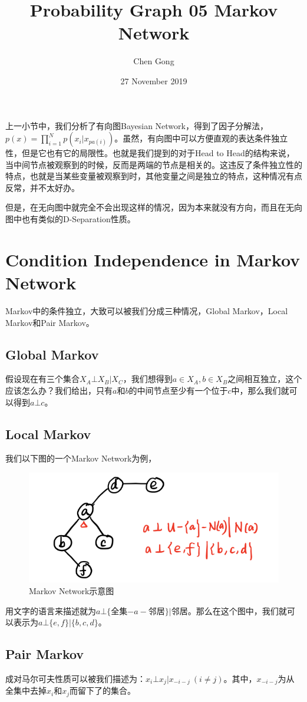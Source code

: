 \documentclass[a4paper]{article}
\title{Probability Graph 05 Markov Network}
\author{Chen Gong}
\date{27 November 2019}
\begin{document}
\maketitle
上一小节中，我们分析了有向图Bayesian Network，得到了因子分解法，$p(x) = \prod_{i=1}^N p(x_i|x_{pa(i)})$。虽然，有向图中可以方便直观的表达条件独立性，但是它也有它的局限性。也就是我们提到的对于Head to Head的结构来说，当中间节点被观察到的时候，反而是两端的节点是相关的。这违反了条件独立性的特点，也就是当某些变量被观察到时，其他变量之间是独立的特点，这种情况有点反常，并不太好办。

但是，在无向图中就完全不会出现这样的情况，因为本来就没有方向，而且在无向图中也有类似的D-Separation性质。
\section{Condition Independence in Markov Network}
Markov中的条件独立，大致可以被我们分成三种情况，Global Markov，Local Markov和Pair Markov。
\subsection{Global Markov}
假设现在有三个集合$X_A \bot X_B | X_C$，我们想得到$a\in X_A,b\in X_B$之间相互独立，这个应该怎么办？我们给出，只有$a$和$b$的中间节点至少有一个位于$c$中，那么我们就可以得到$a \bot c$。

\subsection{Local Markov}
我们以下图的一个Markov Network为例，
\begin{figure}[H]
    \centering
    \includegraphics[width=.55\textwidth]{微信图片_20191126225153.png}
    \caption{Markov Network示意图}
    \label{fig:my_label_1}
\end{figure}

用文字的语言来描述就为$a\bot\{$全集$-a-$邻居$\}|$邻居。那么在这个图中，我们就可以表示为$a\bot\{e,f\}|\{b,c,d\}$。

\subsection{Pair Markov}
成对马尔可夫性质可以被我们描述为：$x_i\bot x_j|x_{-i-j}\ (i\neq j)$。其中，$x_{-i-j}$为从全集中去掉$x_i$和$x_j$而留下了的集合。
\end{document}
